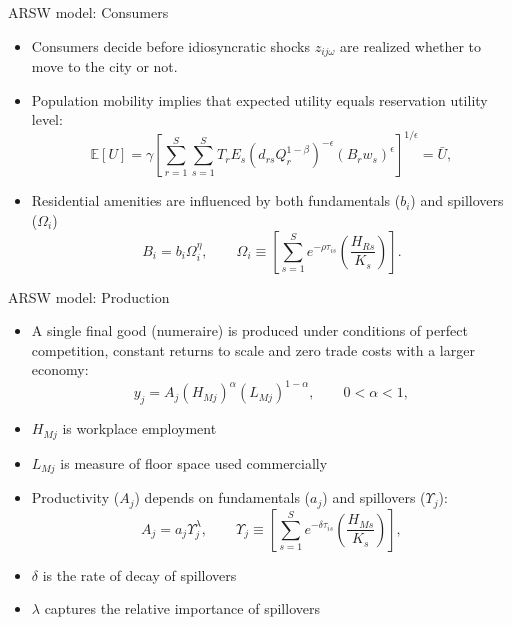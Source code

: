 \documentclass[10pt,notes=hide]{beamer}
\begin{document}
\begin{frame}{ARSW model: Consumers}
\begin{itemize}
\item Consumers decide before idiosyncratic shocks  $z_{ij\omega}$  are realized whether to move to the city or not.
\item Population mobility implies that expected utility equals reservation utility level:
\begin{equation*} \label{eq:pm}
\mathbb{E} \left[ U \right]  = \gamma \left[ \sum_{r=1}^{S} \sum_{s=1}^{S} T_{r} E_{s} \left( d_{rs}
Q_{r}^{1-\beta} \right)^{-\epsilon} \left( B_{r} w_{s} \right)^{\epsilon} %
\right]^{1/\epsilon} = \bar{U},  
\end{equation*}
\item Residential amenities are influenced by both fundamentals ($b_{i}$) and spillovers ($\Omega_{i}$)
\[
 B_{i} = b_{i} \Omega_{i}^{\eta}, \qquad \Omega_{i} \equiv \left[ \sum\limits_{s=1}^{S} e^{-\rho \tau_{is}} \left( \frac{H_{Rs}}{K_s} \right) \right].
\]
\end{itemize}
\end{frame}
\begin{frame}{ARSW model: Production}
\begin{itemize}
\item A single final good (numeraire) is produced under conditions of perfect competition, constant returns to scale and zero trade costs with a larger economy:
\[
y_{j} = A_{j} \left( H_{Mj} \right)^{\alpha} \left( L_{Mj} \right)^{1-\alpha},\qquad 0<\alpha <1,
\]
\item $H_{Mj}$ is workplace employment 
\item $L_{Mj}$ is measure of floor space used commercially
\item Productivity ($A_j$) depends on fundamentals ($a_j$) and spillovers ($\Upsilon_{j}$):
\[
A_{j} = a_{j} \Upsilon_{j}^{\lambda}, \qquad \Upsilon_{j} \equiv \left[ \sum\limits_{s=1}^{S} e^{-\delta \tau_{is}} \left( \frac{H_{Ms}}{K_s} \right) \right],
\]
\item $\delta$ is the rate of decay of spillovers
\item $\lambda$ captures the relative importance of spillovers
\end{itemize}
\end{frame}
\end{document}
